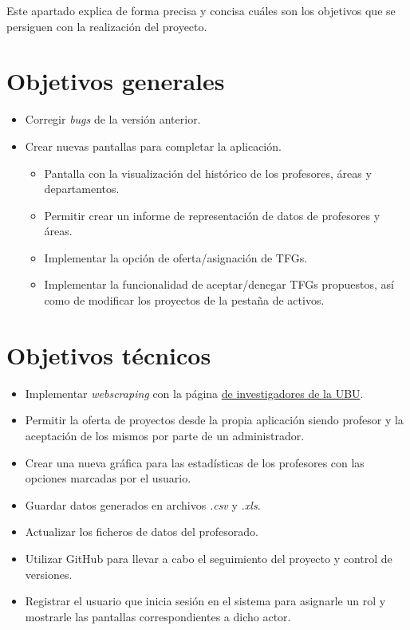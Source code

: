 
Este apartado explica de forma precisa y concisa cuáles son los objetivos que se persiguen con la realización del proyecto.

\section{Objetivos generales}
\begin{itemize}
	\item Corregir \emph{bugs} de la versión anterior.
	\item Crear nuevas pantallas para completar la aplicación.
		\begin{itemize}
			\item Pantalla con la visualización del histórico de los profesores, áreas y departamentos.
			\item Permitir crear un informe de representación de datos de profesores y áreas.
			\item Implementar la opción de oferta/asignación de TFGs.
			\item Implementar la funcionalidad de aceptar/denegar TFGs propuestos, así como de modificar los proyectos de la pestaña de activos.
		\end{itemize}

	
\end{itemize}
\section{Objetivos técnicos}
\begin{itemize}
	\item Implementar \emph{webscraping} con la página \href{https://investigacion.ubu.es/unidades/2682/investigadores}{de investigadores de la UBU}.
	\item Permitir la oferta de proyectos desde la propia aplicación siendo profesor y la aceptación de los mismos por parte de un administrador.
	\item Crear una nueva gráfica para las estadísticas de los profesores con las opciones marcadas por el usuario.
	\item Guardar datos generados en archivos \emph{.csv} y \emph{.xls}.
	\item Actualizar los ficheros de datos del profesorado.
	\item Utilizar GitHub para llevar a cabo el seguimiento del proyecto y control de versiones.
	\item Registrar el usuario que inicia sesión en el sistema para asignarle un rol y mostrarle las pantallas correspondientes a dicho actor.
\end{itemize}